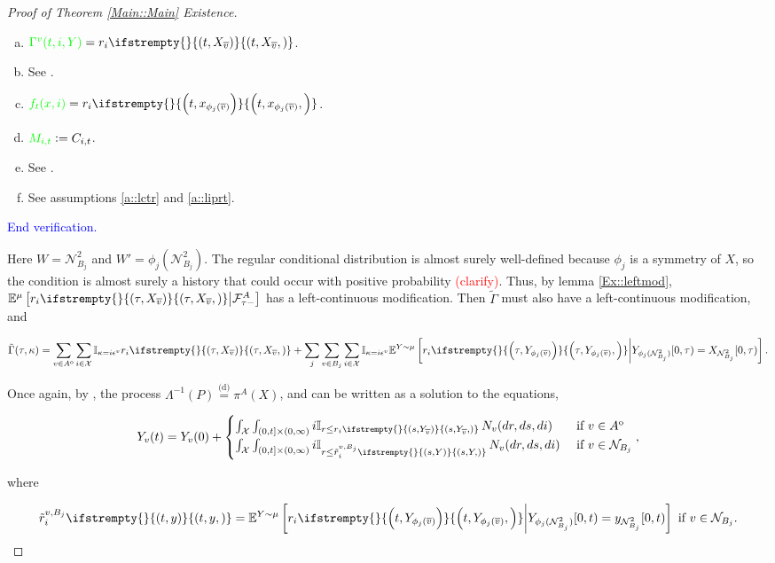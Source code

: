 \documentclass[12pt]{article}
\newcommand{\mb}{\mathbb}
\newcommand{\mc}{\mathcal}
\newcommand{\ov}{\overline}
\newcommand{\te}{\text}
\newcommand{\ep}{\epsilon}
\newcommand{\tr}{\textcolor{red}}
\newcommand{\tb}{\textcolor{blue}}
\newcommand{\tg}{\textcolor{green}}
\newcommand{\ind}{\hspace{24pt}}
\newcommand{\exmu}[2]{\mb{E}^{#1}\left[#2\right]}	%
\newcommand{\deq}{\overset{\text{(d)}}{=}}			%
\newcommand{\defeq}{:=}								%
\newcommand{\sta}{\mc{X}}							%
\newcommand{\neigh}[1]{\mc{N}_{#1}}				%
\newcommand{\dneigh}[1]{\mc{N}^2_{#1}}			%
\newcommand{\cl}[1]{\ov{#1}}						%
\newcommand{\Xf}{X}									%
\newcommand{\poiss}{N}								%
\newcommand{\rate}{r}								%
\newcommand{\F}{\mc{F}}								%
\newcommand{\m}{\mu}								%
\newcommand{\proj}{\pi}								%
\newcommand{\xf}{x}									%
\newcommand{\xg}{y}									%
\newcommand{\poissv}[1]{_{#1}}						%
\newcommand{\vind}[1]{_{#1}}						%
\newcommand{\tme}[1]{(#1)}							%
\newcommand{\tmi}[1]{#1}							%
\newcommand{\vpara}[1]{^{#1}}						%
\newcommand{\stpara}[1]{_{#1}}						%
\newcommand{\tpara}[1]{_{#1}}						%
\newcommand{\jumpibd}[2]{C_{#1,#2}}					%
\newcommand{\tmepro}[3]{
\ifstrempty{#3}{
	\left(#1,#2\right)}{
	\left(#1,#2,#3\right)}}							%
\newcommand{\Xg}{Y}									%
\newcommand{\brate}{\alt{\rate}}					%
\newcommand{\inte}[1]{{#1}^\mathrm{o}}				%
\newcommand{\alt}[1]{\tilde{#1}}					%
\newcommand{\pmap}{\Lambda}							%
\newcommand{\rt}{\tau}								%
\renewcommand{\mark}{\kappa}						%
\newcommand{\ratee}{\Gamma}							%
\newcommand{\cratee}{\alt{\ratee}}					%
\newcommand{\rp}{P}									%
\newcommand{\ev}[1]{\ep^{#1}}						%
\newcommand{\const}{M}								%
\newcommand{\sttpara}[2]{_{#1,#2}}					%
\newcommand{\vjpara}[2]{^{#1,#2}}					%
\begin{document}
\begin{proof}[Proof of Theorem \ref{Main::Main} Existence]
\begin{enumerate}[(a)]
\item \(\tg{\ratee\vpara{v}(t,i,\Xg)} = \rate\stpara{i}\tmepro{t}{\Xf\vind{\cl{v}}}{}\).

\item See \cite[assumption \ref{F-a::bddr}]{F}.

\item \(\tg{f_t(\xf,i)} = \rate\stpara{i}\tmepro{t}{\xf\vind{\phi_j(\cl{v})}}{}\).

\item \(\tg{\const\sttpara{i}{t}} \defeq \jumpibd{i}{t}\).

\item See \cite[assumption \ref{F-a::bddr}]{F}.

\item See assumptions \ref{a::lctr} and \ref{a::liprt}.
\end{enumerate}

\tb{End verification.}

\ind Here \(W = \dneigh{B_j}\) and \(W' = \phi_j(\dneigh{B_j})\). The regular conditional distribution is almost surely well-defined because \(\phi_j\) is a symmetry of \(\Xf\), so the condition is almost surely a history that could occur with positive probability \tr{(clarify)}. Thus, by lemma \ref{Ex::leftmod}, \(\exmu{\m}{\rate\stpara{i}\tmepro{\rt}{\Xf\vind{\cl{v}}}{}\middle|\F\vpara{A}\tpara{\rt-}}\) has a left-continuous modification. Then \(\cratee\) must also have a left-continuous modification, and 

\[\cratee(\rt,\mark) = \sum_{v \in \inte{A}}\sum_{i\in \sta} \mb{I}_{\mark = i\ev{v}}\rate\stpara{i}\tmepro{\rt}{\Xf\vind{\cl{v}}}{} + \sum_j\sum_{v \in B_j}\sum_{i \in \sta} \mb{I}_{\mark = i\ev{v}}\exmu{\Xg\sim \m}{\rate\stpara{i}\tmepro{\rt}{\Xg\vind{\phi_j(\cl{v})}}{}\middle|\Xg\vind{\phi_j(\dneigh{B_j})}\tmi{[0,\rt)} = \Xf\vind{\dneigh{B_j}}\tmi{[0,\rt)}}.\]

Once again, by \cite[Exercise 14.7.1]{DalVer08}, the process \(\pmap^{-1}(\rp) \deq \proj\vpara{A}(\Xf)\), and can be written as a solution to the equations,

\[\Xg\vind{v}\tme{t} = \Xg\vind{v}\tme{0} + \begin{cases}
\int_\sta\int_{(0,t]\times (0,\infty)} i\mb{I}_{r \leq \rate\stpara{i}\tmepro{s}{\Xg\vind{\cl{v}}}{}}\,\poiss\poissv{v}(dr,ds,di) &\te{ if } v \in \inte{A}\\
\int_\sta\int_{(0,t]\times (0,\infty)} i\mb{I}_{r \leq \brate\vjpara{v}{B_j}\stpara{i}\tmepro{s}{\Xg}{}}\,\poiss\poissv{v}(dr,ds,di) &\te{ if } v \in \neigh{B_j}
\end{cases},\]

where

\[\brate\vjpara{v}{B_j}\stpara{i}\tmepro{t}{\xg}{} = \exmu{\Xg\sim \m}{\rate\stpara{i}\tmepro{t}{\Xg\vind{\phi_j(\cl{v})}}{}\middle|\Xg\vind{\phi_j(\dneigh{B_j})}\tmi{[0,t)} = \xg\vind{\dneigh{B_j}}\tmi{[0,t)}}\te{ if } v \in \neigh{B_j}.\]

\end{proof}
\end{document}

